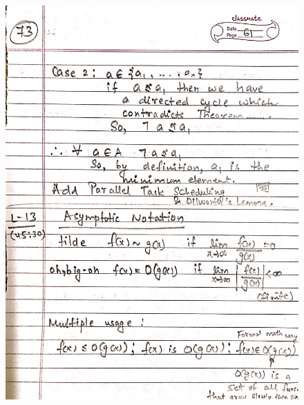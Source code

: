 \begin{figure}[H]
    \centering
    \includegraphics[scale=0.25]{"./MIT 6.042J/MIT_6042J_073"}
\end{figure}
\newpage
